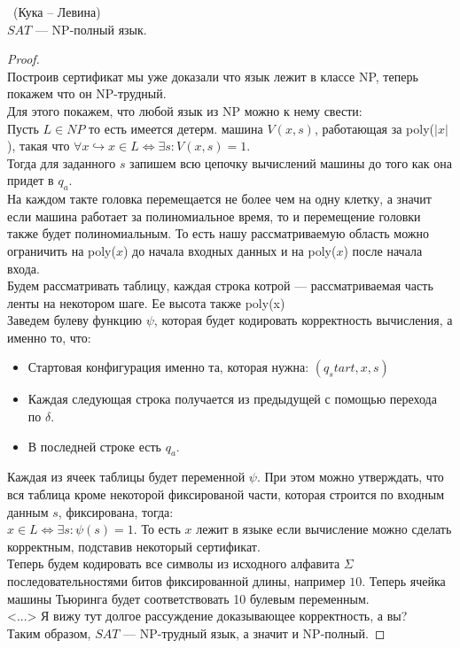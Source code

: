 \begin{theorem} \ (Кука -- Левина) \\
   $SAT$ ---  NP-полный язык. 
\end{theorem}
\begin{proof} \ \\
    Построив сертификат мы уже доказали что язык лежит в классе NP, теперь покажем что он NP-трудный. \\
    Для этого покажем, что любой язык из NP можно к нему свести: \\
    Пусть $L \in NP$ то есть имеется детерм. машина $V(x, s)$, работающая за poly($\lvert x \rvert$), такая что 
    $\forall x \hookrightarrow x \in L \iff \exists s: V(x, s) = 1$. \\

    Тогда для заданного $s$ запишем всю цепочку вычислений машины до того как она придет в  $q_a$. \\
    На каждом такте головка перемещается не более чем на одну клетку, а значит если машина работает за полиномиальное время,
    то и перемещение головки также будет полиномиальным. То есть нашу рассматриваемую область 
    можно ограничить на poly($x$) до начала входных данных и на poly($x$) после начала входа. \\
    Будем рассматривать таблицу, каждая строка котрой --- рассматриваемая часть ленты на некотором шаге. Ее высота также poly(x) \\
    Заведем булеву функцию $\psi$, которая будет кодировать корректность вычисления, а именно то, что:
    \begin{itemize}
        \item Стартовая конфигурация именно та, которая нужна: $(q_start, x, s)$
        \item Каждая следующая строка получается из предыдущей с помощью перехода по  $\delta$.
        \item В последней строке есть  $q_a$.
    \end{itemize}
    Каждая из ячеек таблицы будет переменной $\psi$. При этом можно утверждать, что вся таблица кроме некоторой фиксированой части, 
    которая строится по входным данным $s$, фиксирована, тогда: \\
    $x \in L \iff \exists s: \psi(s) = 1$. То есть $x$ лежит в языке если вычисление можно сделать корректным, подставив некоторый сертификат. \\
    Теперь будем кодировать все символы из исходного алфавита $\Sigma$ последовательностями битов фиксированной длины, например $10$. 
    Теперь ячейка машины Тьюринга будет соответствовать 10 булевым переменным.  \\
    <...> Я вижу тут долгое рассуждение доказывающее корректность, а вы? \\
    Таким образом,  $SAT$ --- NP-трудный язык, а значит и NP-полный.

    


\end{proof}
